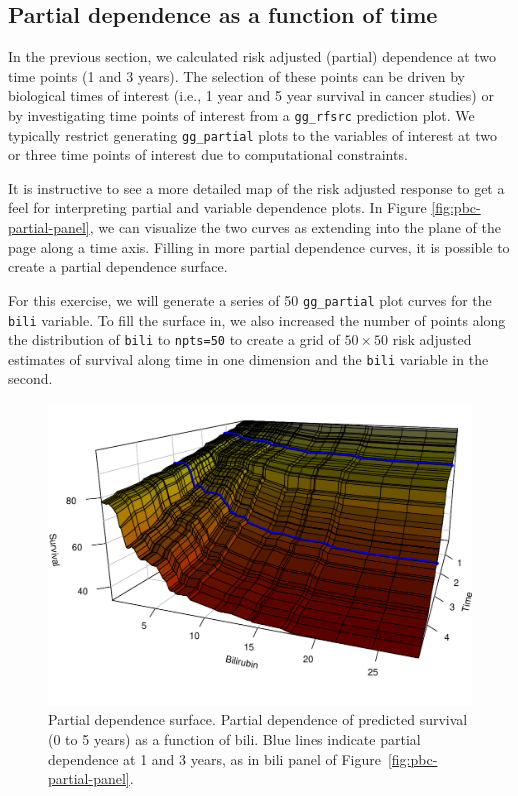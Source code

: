 \documentclass[article]{jss}
\begin{document}
\subsection{Partial dependence as a function of
time}\label{partial-dependence-as-a-function-of-time}

In the previous section, we calculated risk adjusted (partial)
dependence at two time points (1 and 3 years). The selection of these
points can be driven by biological times of interest (i.e., 1 year and 5
year survival in cancer studies) or by investigating time points of
interest from a \texttt{gg\_rfsrc} prediction plot. We typically
restrict generating \texttt{gg\_partial} plots to the variables of
interest at two or three time points of interest due to computational
constraints.

It is instructive to see a more detailed map of the risk adjusted
response to get a feel for interpreting partial and variable dependence
plots. In Figure \ref{fig:pbc-partial-panel}, we can visualize the two
curves as extending into the plane of the page along a time axis.
Filling in more partial dependence curves, it is possible to create a
partial dependence surface.

For this exercise, we will generate a series of 50 \texttt{gg\_partial}
plot curves for the \texttt{bili} variable. To fill the surface in, we
also increased the number of points along the distribution of
\texttt{bili} to \texttt{npts=50} to create a grid of \(50 \times 50\)
risk adjusted estimates of survival along time in one dimension and the
\texttt{bili} variable in the second.

\begin{Schunk}
\begin{figure}[!htb]

{\centering \includegraphics{fig-rfs/rfs-timeSurface3d-1} 

}

\caption{Partial dependence surface. Partial dependence of predicted survival (0 to 5 years) as a function of bili. Blue lines indicate partial dependence at 1 and 3 years, as in bili panel of Figure~\ref{fig:pbc-partial-panel}.}\label{fig:timeSurface3d}
\end{figure}
\end{Schunk}
\end{document}
